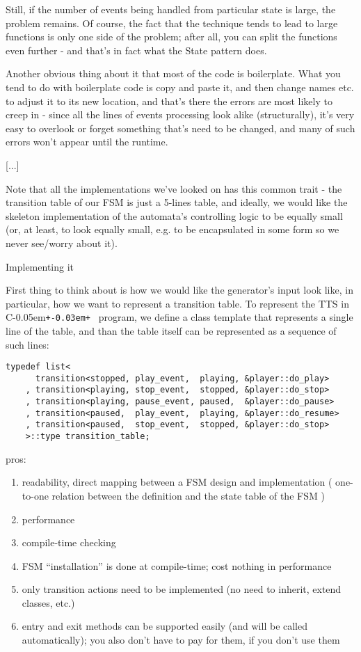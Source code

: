 \documentclass{kapproc}
\newcommand{\Cpp}{C\kern-0.05em\texttt{+\kern-0.03em+}%
}
\begin{document}
Still, if the number of events being handled from particular 
state is large, the problem remains. Of course, the fact that 
the technique tends to lead to large functions is only one 
side of the problem; after all, you can split the functions 
even further - and that's in fact what the State pattern does.

Another obvious thing about it that most of the code is 
boilerplate. What you tend to do with boilerplate code is copy 
and paste it, and then change names etc. to adjust it to its new 
location, and that's there the errors are most likely to creep in
- since all the lines of events processing look alike 
(structurally), it's very easy to overlook or forget something 
that's need to be changed, and many of such errors won't appear 
until the runtime.

[...]

Note that all the implementations we've looked on has this common 
trait - the transition table of our FSM is just a 5-lines table, 
and ideally, we would like the skeleton implementation of the 
automata's controlling logic to be equally small (or, at least, 
to look equally small, e.g. to be encapsulated in some form so 
we never see/worry about it). 

Implementing it

First thing to think about is how we would like the generator's 
input look like, in particular, how we want to represent a 
transition table. To represent the TTS in \Cpp\ program, we define 
a  class template that represents a single line 
of the table, and than the table itself can be represented as a 
sequence of such lines:

{\small
\begin{codesamp}\begin{verbatim}
typedef list<
      transition<stopped, play_event,  playing, &player::do_play>
    , transition<playing, stop_event,  stopped, &player::do_stop>
    , transition<playing, pause_event, paused,  &player::do_pause>
    , transition<paused,  play_event,  playing, &player::do_resume>
    , transition<paused,  stop_event,  stopped, &player::do_stop>
    >::type transition_table;
\end{verbatim}
\end{codesamp}
}

pros:
\begin{enumerate}
\item readability, direct mapping between a FSM design and 
    implementation ( one-to-one relation between the 
    definition and the state table of the FSM )
\item performance %
\item compile-time checking 
\item FSM ``installation'' is done at compile-time; cost 
    nothing in performance 
\item only transition actions need to be implemented 
    (no need to inherit, extend classes, etc.) 
\item entry and exit methods can be supported easily 
    (and will be called automatically); you also don't have 
    to pay for them, if you don't use them 
\end{enumerate}
\end{document}
